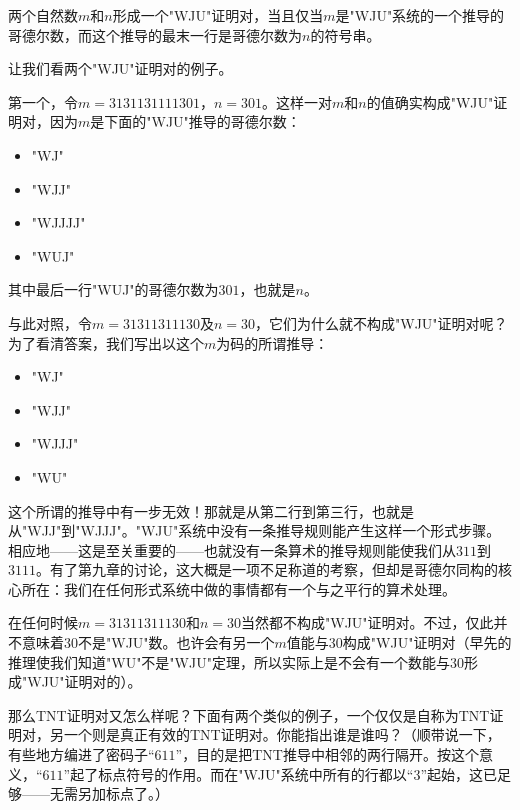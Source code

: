 \begin{block}
两个自然数$m$和$n$形成一个"WJU"证明对，当且仅当$m$是"WJU"系统的一个推导的哥德尔数，而这个推导的最末一行是哥德尔数为$n$的符号串。
\end{block}

让我们看两个"WJU"证明对的例子。

第一个，令$m=3131131111301$，$n=301$。这样一对$m$和$n$的值确实构成"WJU"证明对，因为$m$是下面的"WJU"推导的哥德尔数：
\begin{itemize}
\item "WJ"
\item "WJJ"
\item "WJJJJ"
\item "WUJ"
\end{itemize}
其中最后一行"WUJ"的哥德尔数为$301$，也就是$n$。

与此对照，令$m=31311311130$及$n=30$，它们为什么就不构成"WJU"证明对呢？为了看清答案，我们写出以这个$m$为码的所谓推导：
\begin{itemize}
\item "WJ"
\item "WJJ"
\item "WJJJ"
\item "WU"
\end{itemize}

这个所谓的推导中有一步无效！那就是从第二行到第三行，也就是从"WJJ"到"WJJJ"。"WJU"系统中没有一条推导规则能产生这样一个形式步骤。相应地——这是至关重要的——也就没有一条算术的推导规则能使我们从$311$到$3111$。有了第九章的讨论，这大概是一项不足称道的考察，但却是哥德尔同构的核心所在：我们在任何形式系统中做的事情都有一个与之平行的算术处理。

在任何时候$m=31311311130$和$n=30$当然都不构成"WJU"证明对。不过，仅此并不意味着$30$不是"WJU"数。也许会有另一个$m$值能与$30$构成"WJU"证明对（早先的推理使我们知道"WU"不是"WJU"定理，所以实际上是不会有一个数能与$30$形成"WJU"证明对的）。

那么TNT证明对又怎么样呢？下面有两个类似的例子，一个仅仅是自称为TNT证明对，另一个则是真正有效的TNT证明对。你能指出谁是谁吗？（顺带说一下，有些地方编进了密码子“$611$”，目的是把TNT推导中相邻的两行隔开。按这个意义，“$611$”起了标点符号的作用。而在"WJU"系统中所有的行都以“$3$”起始，这已足够——无需另加标点了。）


